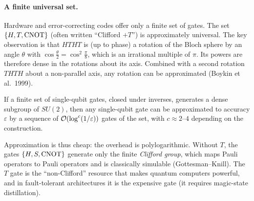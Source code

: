 \paragraph{A finite universal set.} Hardware and error-correcting codes offer only a finite set of gates. The set $\{H,T,\mathrm{CNOT}\}$ (often written ``Clifford $+T$'') is approximately universal.
The key observation is that $HTHT$ is (up to phase) a rotation of the Bloch sphere by an angle $\theta$ with $\cos\frac\theta2=\cos^2\frac\pi8$, which is an irrational multiple of $\pi$.
Its powers are therefore dense in the rotations about its axis. Combined with a second rotation $THTH$ about a non-parallel axis, any rotation can be approximated (Boykin et al.\ 1999).
\begin{theorem}
If a finite set of single-qubit gates, closed under inverses, generates a dense subgroup of $SU(2)$, then any single-qubit gate can be approximated to accuracy $\varepsilon$ by a sequence
of $\mathcal O(\log^c(1/\varepsilon))$ gates of the set, with $c\approx2$--$4$ depending on the construction.
\end{theorem}
Approximation is thus cheap: the overhead is polylogarithmic. Without $T$, the gates $\{H,S,\mathrm{CNOT}\}$ generate only the finite \emph{Clifford group}, which maps Pauli operators to Pauli
operators and is classically simulable (Gottesman--Knill). The $T$ gate is the ``non-Clifford'' resource that makes quantum computers powerful, and in fault-tolerant architectures it is
the expensive gate (it requires magic-state distillation).

